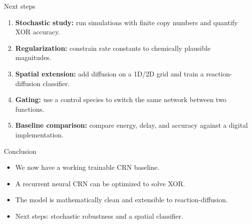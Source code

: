 \documentclass[aspectratio=169,11pt]{beamer}
\begin{document}
\begin{frame}{Next steps}

\begin{enumerate}
    \item \textbf{Stochastic study:} run simulations with finite copy numbers and quantify XOR accuracy.
    \item \textbf{Regularization:} constrain rate constants to chemically plausible magnitudes.
    \item \textbf{Spatial extension:} add diffusion on a 1D/2D grid and train a reaction-diffusion classifier.
    \item \textbf{Gating:} use a control species to switch the same network between two functions.
    \item \textbf{Baseline comparison:} compare energy, delay, and accuracy against a digital implementation.
\end{enumerate}

\end{frame}

\begin{frame}{Conclusion}

\begin{itemize}
    \item We now have a working trainable CRN baseline.
    \item A recurrent neural CRN can be optimized to solve XOR.
    \item The model is mathematically clean and extensible to reaction-diffusion.
    \item Next steps: stochastic robustness and a spatial classifier.
\end{itemize}

\end{frame}
\end{document}
